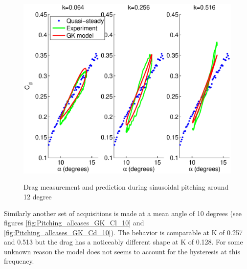 \begin{figure}[h]
  \begin{center}
    \scalebox{0.6}  
    {\includegraphics{./Figures/Pitching_allcases_GK_CD_12_amp_2.eps}}
  \end{center}
  \caption{Drag measurement and prediction during sinusoidal pitching around 12 degree} 
  \label{fig:Pitching_allcases_GK_Cd_12}
\end{figure}

\par Similarly another set of acquisitions is made at a mean angle of 10 degrees (see figures \ref{fig:Pitching_allcases_GK_Cl_10} and \ref{fig:Pitching_allcases_GK_Cd_10}).
The behavior is comparable at K of 0.257 and 0.513 but the drag has a noticeably different shape at K of 0.128.
For some unknown reason the model does not seems to account for the hysteresis at this frequency.

